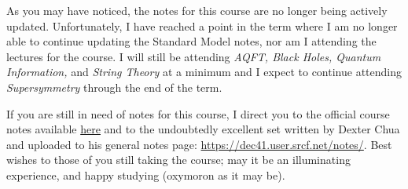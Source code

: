 As you may have noticed, the notes for this course are no longer being actively updated. Unfortunately, I have reached a point in the term where I am no longer able to continue updating the Standard Model notes, nor am I attending the lectures for the course. I will still be attending \emph{AQFT, Black Holes, Quantum Information,} and \emph{String Theory} at a minimum and I expect to continue attending \emph{Supersymmetry} through the end of the term.

If you are still in need of notes for this course, I direct you to the official course notes available \href{http://www.damtp.cam.ac.uk/user/cet34/teaching/SM/stdmodel.pdf}{here} and to the undoubtedly excellent set written by Dexter Chua and uploaded to his general notes page: \url{https://dec41.user.srcf.net/notes/}. Best wishes to those of you still taking the course; may it be an illuminating experience, and happy studying (oxymoron as it may be).